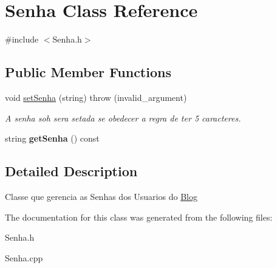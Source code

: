 \hypertarget{classSenha}{}\section{Senha Class Reference}
\label{classSenha}


{\ttfamily \#include $<$Senha.\+h$>$}

\subsection*{Public Member Functions}
\begin{DoxyCompactItemize}
\item 
void \hyperlink{classSenha_a735e4bf5f65cc8d28daa7dbf202fd999}{set\+Senha} (string)  throw (invalid\+\_\+argument)\hypertarget{classSenha_a735e4bf5f65cc8d28daa7dbf202fd999}{}\label{classSenha_a735e4bf5f65cc8d28daa7dbf202fd999}

\begin{DoxyCompactList}\small\item\em A senha soh sera setada se obedecer a regra de ter 5 caracteres. \end{DoxyCompactList}\item 
string {\bfseries get\+Senha} () const \hypertarget{classSenha_ac545df9d1b3255629497c771e68e9ea4}{}\label{classSenha_ac545df9d1b3255629497c771e68e9ea4}

\end{DoxyCompactItemize}


\subsection{Detailed Description}
Classe que gerencia as Senhas dos Usuarios do \hyperlink{classBlog}{Blog} 

The documentation for this class was generated from the following files\+:\begin{DoxyCompactItemize}
\item 
Senha.\+h\item 
Senha.\+cpp\end{DoxyCompactItemize}
